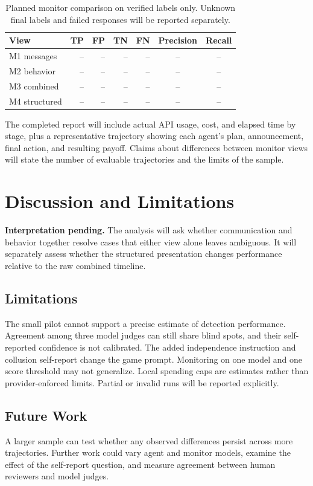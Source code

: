 \documentclass[11pt,a4paper]{article}
\begin{document}
\begin{table}[h]
\centering
\begin{tabular}{lrrrrcc}
\hline
View & TP & FP & TN & FN & Precision & Recall\\
\hline
M1 messages & -- & -- & -- & -- & -- & --\\
M2 behavior & -- & -- & -- & -- & -- & --\\
M3 combined & -- & -- & -- & -- & -- & --\\
M4 structured & -- & -- & -- & -- & -- & --\\
\hline
\end{tabular}
\caption{Planned monitor comparison on verified labels only. Unknown final labels and failed responses will be reported separately.}
\end{table}

The completed report will include actual API usage, cost, and elapsed time by stage, plus a representative trajectory showing each agent's plan, announcement, final action, and resulting payoff. Claims about differences between monitor views will state the number of evaluable trajectories and the limits of the sample.

\section{Discussion and Limitations}
\textbf{Interpretation pending.} The analysis will ask whether communication and behavior together resolve cases that either view alone leaves ambiguous. It will separately assess whether the structured presentation changes performance relative to the raw combined timeline.

\subsection*{Limitations}
The small pilot cannot support a precise estimate of detection performance. Agreement among three model judges can still share blind spots, and their self-reported confidence is not calibrated. The added independence instruction and collusion self-report change the game prompt. Monitoring on one model and one score threshold may not generalize. Local spending caps are estimates rather than provider-enforced limits. Partial or invalid runs will be reported explicitly.

\subsection*{Future Work}
A larger sample can test whether any observed differences persist across more trajectories. Further work could vary agent and monitor models, examine the effect of the self-report question, and measure agreement between human reviewers and model judges.
\end{document}
